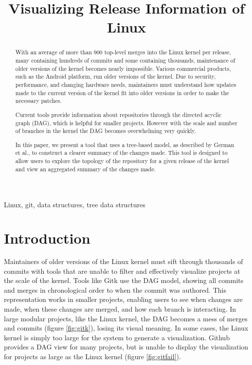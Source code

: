 \documentclass[conference, draftclsnofoot]{IEEEtran}
\makeatletter
\newcommand{\TheTitle}{Visualizing Release Information of Linux}
\newcommand{\TheAuthors}{Evan Wilde}
\newcommand{\TheEmails}{etcwilde@uvic.ca}
\newcommand{\TheKeywords}{Linux, git, data structures, tree data structures}
\makeatother
\begin{document}
\title{\TheTitle}
\author{
\IEEEauthorblockA{\TheAuthors}
\IEEEauthorblockA{Email: \TheEmails}
}
\maketitle
\begin{abstract}

        With an average of more than 900 top-level merges into the Linux kernel per
        release, many containing hundreds of commits and some containing thousands,
        maintenance of older versions of the kernel becomes nearly impossible.
        Various commercial products, such as the Android platform, run older
        versions of the kernel. Due to security, performance, and changing hardware
        needs, maintainers must understand how updates made to the current version
        of the kernel fit into older versions in order to make the necessary
        patches.

        Current tools provide information about repositories through the directed
        acyclic graph (DAG), which is helpful for smaller projects. However with the
        scale and number of branches in the kernel the DAG becomes overwhelming very
        quickly.

        In this paper, we present a tool that uses a tree-based model, as described
        by German et al., to construct a clearer summary of the changes made. This
        tool is designed to allow users to explore the topology of the repository
        for a given release of the kernel and view an aggregated summary of the
        changes made.

\end{abstract}

\begin{IEEEkeywords}
\TheKeywords
\end{IEEEkeywords}

\section{Introduction}

Maintainers of older versions of the Linux kernel must sift through thousands of
commits with tools that are unable to filter and effectively visualize projects at
the scale of the kernel. Tools like Gitk use the DAG model, showing all commits and
merges in chronological order to when the commit was authored. This representation
works in smaller projects, enabling users to see when changes are made, when these
changes are merged, and how each branch is interacting. In large modular projects,
like the Linux kernel, the DAG becomes a mess of merges and commits (figure
\ref{fig:gitk}), losing its visual meaning. In some cases, the Linux kernel is
simply too large for the system to generate a visualization. Github provides a DAG
view for many projects, but is unable to display the visualization for projects as
large as the Linux kernel (figure \ref{fig:gitfail}).
\end{document}
